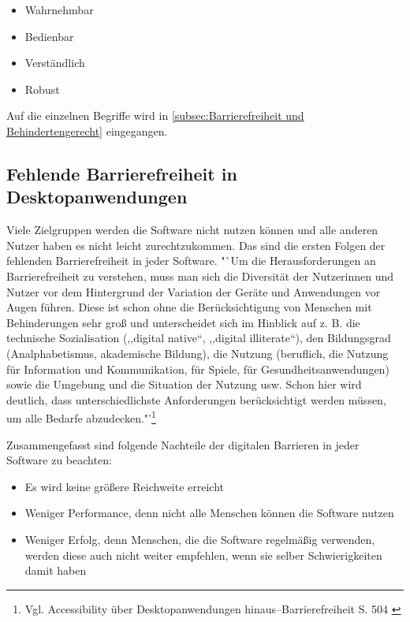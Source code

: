 \begin{itemize}
	\item Wahrnehmbar
	\item Bedienbar
	\item Verständlich
	\item Robust
\end{itemize}

Auf die einzelnen Begriffe wird in \cref{subsec:Barrierefreiheit und Behindertengerecht} eingegangen.

\subsection{Fehlende Barrierefreiheit in Desktopanwendungen}
\label{subsec: Fehlende Barrierefreiheit in Desktopanwendungen}

Viele Zielgruppen werden die Software nicht nutzen können und alle anderen Nutzer haben es nicht leicht zurechtzukommen. Das sind die ersten Folgen der fehlenden Barrierefreiheit in jeder Software. "`Um die Herausforderungen an Barrierefreiheit zu verstehen, muss man sich die Diversität der Nutzerinnen und Nutzer vor dem Hintergrund der Variation der Geräte und Anwendungen vor Augen führen. Diese ist schon ohne die Berücksichtigung von Menschen mit Behinderungen sehr groß und unterscheidet sich im Hinblick auf z. B. die technische Sozialisation (,,digital native“, ,,digital illiterate“), den Bildungsgrad (Analphabetismus, akademische Bildung), die Nutzung (beruflich, die Nutzung für Information und Kommunikation, für Spiele, für Gesundheitsanwendungen) sowie die Umgebung und die Situation der Nutzung usw. Schon hier wird deutlich, dass unterschiedlichste Anforderungen berücksichtigt werden müssen, um alle Bedarfe abzudecken."'\footnote{Vgl. Accessibility über Desktopanwendungen hinaus–Barrierefreiheit S. 504 \cite{buhler2017accessibility}}

Zusammengefasst sind folgende Nachteile der digitalen Barrieren in jeder Software zu beachten:
\vspace{1em}

\begin{itemize}
	\item Es wird keine größere Reichweite erreicht
	\item Weniger Performance, denn nicht alle Menschen können die Software nutzen
	\item Weniger Erfolg, denn Menschen, die die Software regelmäßig verwenden, werden diese auch nicht weiter empfehlen, wenn sie selber Schwierigkeiten damit haben
\end{itemize}

